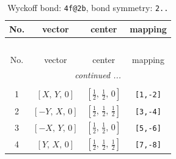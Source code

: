 \documentclass[fleqn,8pt]{jsarticle}
\begin{document}
\renewcommand{\arraystretch}{1.2}
\begin{longtable}{cccc}
\caption{Wyckoff bond: {\tt 4f@2b}, bond symmetry: {\tt 2..}}
 \\
 \hline \hline
No. & vector & center & mapping \\ \hline \endfirsthead

\multicolumn{3}{l}{\tablename\ \thetable{}} \\
 \hline \hline
No. & vector & center & mapping \\ \hline \endhead

 \hline \hline
\multicolumn{3}{r}{\footnotesize\it continued ...} \\ \endfoot

 \hline \hline
\multicolumn{3}{r}{} \\ \endlastfoot

1 & $\left[ X,\, Y,\, 0 \right]$ & $\left[ \frac{1}{2},\, \frac{1}{2},\, 0 \right]$ & {\tt [1,-2]} \\ \hline
2 & $\left[ - Y,\, X,\, 0 \right]$ & $\left[ \frac{1}{2},\, \frac{1}{2},\, \frac{1}{2} \right]$ & {\tt [3,-4]} \\ \hline
3 & $\left[ - X,\, Y,\, 0 \right]$ & $\left[ \frac{1}{2},\, \frac{1}{2},\, 0 \right]$ & {\tt [5,-6]} \\ \hline
4 & $\left[ Y,\, X,\, 0 \right]$ & $\left[ \frac{1}{2},\, \frac{1}{2},\, \frac{1}{2} \right]$ & {\tt [7,-8]} \\
\end{longtable}
\renewcommand{\arraystretch}{1.2}
\end{document}
